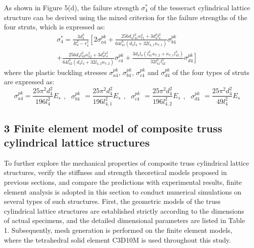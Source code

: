 \documentclass{article} %
\begin{document}
As shown in Figure 5(d), the failure strength $\sigma _{4}^{*} $ of the tesseract cylindrical lattice structure can be derived using the mixed criterion for the failure strengths of the four struts, which is expressed as:
\begin{equation} \label{GrindEQ__29_} 
\begin{array}{l} {\sigma _{4}^{*} =\frac{3d_{4}^{2} }{R_{4}^{2} -r_{4}^{2} } \left[2\sigma _{a4}^{pk} \right. +\frac{256d_{4} l_{41}^{2} \kappa _{71}^{2} +3d_{4}^{3} l_{4}^{2} }{64l_{41}^{3} \left(d_{4} l_{4} +32l_{4,1} \kappa _{7,1} \right)} \sigma _{b4}^{pk} } \\ {+\frac{256d_{4} l_{42}^{2} \kappa _{72}^{2} +3d_{4}^{3} l_{4}^{2} }{64l_{42}^{3} \left(d_{4} l_{4} +32l_{4,2} \kappa _{7,2} \right)} \sigma _{c4}^{pk} +\frac{3d_{4} l_{4} \left(l_{41}^{3} \kappa _{7,2} +\kappa _{7,1} l_{42}^{3} \right)}{32l_{41}^{3} l_{42}^{3} } \left. \sigma _{d4}^{pk} \right]} \end{array} 
\end{equation} 
where the plastic buckling stresses $\sigma _{a4}^{pk} $, $\sigma _{b4}^{pk} $, $\sigma _{c4}^{pk} $ and $\sigma _{d4}^{pk} $ of the four types of struts are expressed as:
\[\sigma _{a4}^{pk} =\frac{25\pi ^{2} d_{4}^{2} }{196l_{4}^{2} } E_{s} \begin{array}{cc} {,} & {\sigma _{b4}^{pk} } \end{array}=\frac{25\pi ^{2} d_{4}^{2} }{196l_{4,1}^{2} } E_{s} \begin{array}{cc} {,} & {\sigma _{c4}^{pk} } \end{array}=\frac{25\pi ^{2} d_{4}^{2} }{196l_{4,2}^{2} } E_{s} \begin{array}{cc} {,} & {\sigma _{d4}^{pk} } \end{array}=\frac{25\pi ^{2} d_{4}^{2} }{49l_{4}^{2} } E_{s} \] 

\subsection{3 Finite element model of composite truss cylindrical lattice structures}

To further explore the mechanical properties of composite truss cylindrical lattice structures, verify the stiffness and strength theoretical models proposed in previous sections, and compare the predictions with experimental results, finite element analysis is adopted in this section to conduct numerical simulations on several types of such structures. First, the geometric models of the truss cylindrical lattice structures are established strictly according to the dimensions of actual specimens, and the detailed dimensional parameters are listed in Table 1. Subsequently, mesh generation is performed on the finite element models, where the tetrahedral solid element C3D10M is used throughout this study.
\end{document}
